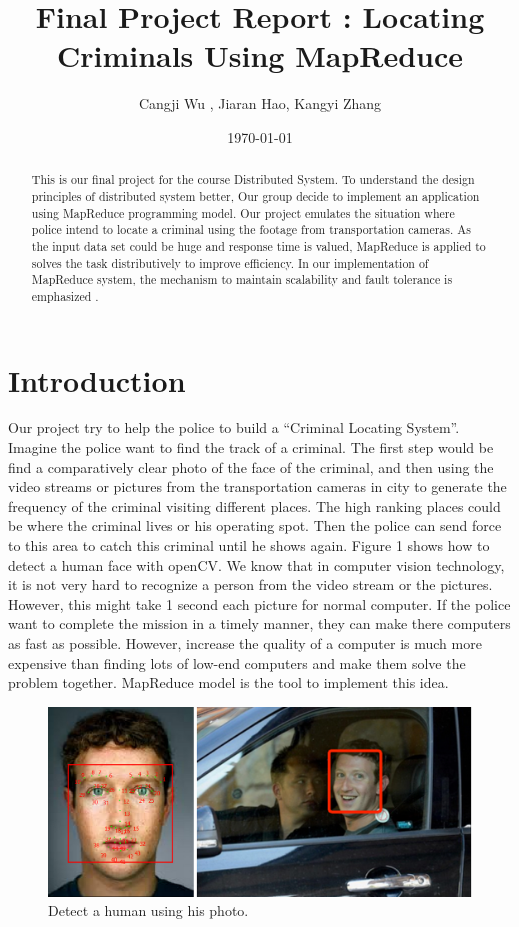\documentclass[12pt]{article}
\begin{document}
\title{Final Project Report : Locating Criminals Using MapReduce}
\author{Cangji Wu , Jiaran Hao, Kangyi Zhang}
\date{\today}
\maketitle

\begin{abstract}
This is our final project for the course Distributed System. To understand the design principles
of distributed system better, Our group decide to implement an application using MapReduce programming model. 
Our project emulates the situation where police intend to locate a criminal using the footage from transportation cameras. 
As the input data set could be huge and response time is valued, MapReduce is applied to solves the task distributively to
improve efficiency. In our implementation of MapReduce system, the mechanism to maintain scalability and fault tolerance is emphasized
. 
\end{abstract} 

\section {Introduction}

Our project try to help the police to build a “Criminal Locating System”. Imagine the police want to find the track of a criminal.
The first step would be find a comparatively clear photo of the face of the criminal, and then using the video streams or pictures from the transportation cameras in city to generate the frequency of the criminal visiting different places. The high ranking places could be where the criminal lives or his operating spot. Then the police can send force to this area to catch this criminal until he shows again. Figure 1 shows how to detect a human face with openCV.
We know that in computer vision technology, it is not very hard to recognize a person from the video stream or the pictures. However, this might take 1 second each picture for normal computer. If the police want to complete the mission in a timely manner, they can make there computers as fast as possible. However, increase the quality of a computer is much more expensive than finding lots of low-end computers and make them solve the problem together. MapReduce model is the tool to implement this idea.

\begin{figure}[h!]
  
  \centering
    \includegraphics[width=1\textwidth]{2.png}
    \caption{Detect a human using his photo.}
\end{figure}
\end{document}
